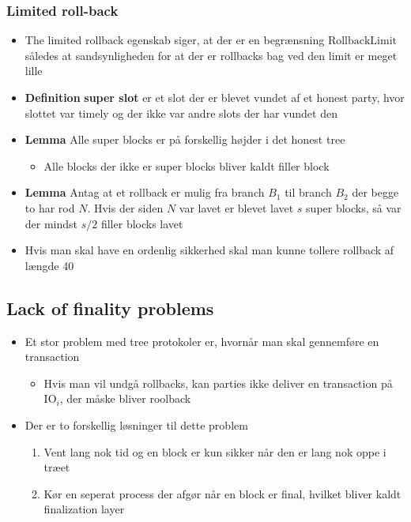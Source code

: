 \documentclass[a4, english]{article}
\begin{document}
\subsubsection{Limited roll-back}
\begin{itemize}
  \item The limited rollback egenskab siger, at der er en begrænsning $\text{RollbackLimit}$ således at sandsynligheden for at der er rollbacks bag ved den limit er meget lille
  \item \textbf{Definition} \textbf{super slot} er et slot der er blevet vundet af et honest party, hvor slottet var timely og der ikke var andre slots der har vundet den 
  \item \textbf{Lemma} Alle super blocks er på forskellig højder i det honest tree
  \begin{itemize}
  	\item Alle blocks der ikke er super blocks bliver kaldt filler block
  \end{itemize}
  \item \textbf{Lemma} Antag at et rollback er mulig fra branch $B_1$ til branch $B_2$ der begge to har rod $N$. Hvis der siden $N$ var lavet er blevet lavet $s$ super blocks, så var der mindst $s/2$ filler blocks lavet
  \item Hvis man skal have en ordenlig sikkerhed skal man kunne tollere rollback af længde 40  
\end{itemize}

\subsection{Lack of finality problems}
\begin{itemize}
	\item Et stor problem med tree protokoler er, hvornår man skal gennemføre en transaction 
  \begin{itemize}
  	\item Hvis man vil undgå rollbacks, kan parties ikke deliver en transaction på $\text{IO}_i$, der måske bliver roolback
  \end{itemize}
  \item Der er to forskellig løsninger til dette problem 
  \begin{enumerate}
  	\item Vent lang nok tid og en block er kun sikker når den er lang nok oppe i træet 
    \item Kør en seperat process der afgør når en block er final, hvilket bliver kaldt finalization layer
  \end{enumerate}
\end{itemize}

\newpage
\end{document}
